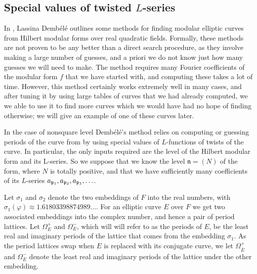 \documentclass{amsart}
\newcommand{\n}{\mathfrak{n}}
\newcommand{\ap}[1]{a_{\p_{#1}}}
\newcommand{\Ebar}{\overline{E}}
\newcommand{\dembele}{Demb\'el{\'e}\xspace}
\begin{document}
\subsection{Special values of twisted $L$-series}\label{sec:specialvalues}
\newcommand{\Omegap}{\Omega^+}
\newcommand{\Omegam}{\Omega^-}
\newcommand{\Omegapp}{\Omega^{++}}
\newcommand{\Omegapm}{\Omega^{+-}}
\newcommand{\Omegamp}{\Omega^{-+}}
\newcommand{\Omegamm}{\Omega^{--}}
\newcommand{\OmegammEguess}{\Omega^{--}_{E, \mathrm{guess}}}
\newcommand{\OmegampEguess}{\Omega^{-+}_{E, \mathrm{guess}}}
\newcommand{\OmegapmEguess}{\Omega^{+-}_{E, \mathrm{guess}}}
\newcommand{\OmegappEguess}{\Omega^{++}_{E, \mathrm{guess}}}

In \cite{dembele:elliptic-curves-quadratic-fields}, Lassina \dembele outlines
some methods for finding
modular elliptic curves from Hilbert modular forms over real quadratic
fields. Formally, these methods are not proven to be any better than a direct
search procedure, as they involve making a large number of guesses, and a
priori we do not know just how many guesses we will need to make.
The method requires many Fourier coefficients of the modular form $f$ that we
have started with, and computing these takes a lot of time. However,
this method certainly works extremely well in many cases, and after tuning
it by using large tables of curves that we had already computed, we we able
to use it to find more curves which we would have had no hope of finding
otherwise; we will give an example of one of these curves later.

In the case of nonsquare level \dembele's method relies on computing
or guessing periods of the curve from by using special values of
$L$-functions of twists of the curve. In particular, the only inputs
required are the level of the Hilbert modular form and its L-series. So
we suppose that we know the level $\n = (N)$ of the form, where $N$ is
totally positive, and that we have sufficiently many coefficients of its
$L$-series $\ap{1}, \ap{2}, \ap{3}, \ldots$.

Let $\sigma_1$ and $\sigma_2$ denote the two embeddings of $F$ into the
real numbers, with $\sigma_1(\varphi) \approx 1.61803398874989\ldots$. For
an elliptic curve $E$ over $F$ we get two associated embeddings into
the complex number, and hence a pair of period lattices. Let $\Omegap_E$
and $\Omegam_E$, which will will refer to as the periods of $E$,
be the least real and imaginary periods of the lattice
that comes from the embedding $\sigma_1$. As the period lattices swap
when $E$ is replaced with its conjugate curve, we let $\Omegap_{\Ebar}$
and $\Omegam_{\Ebar}$ denote the least real and imaginary periods
of the lattice under the other embedding.
\end{document}
